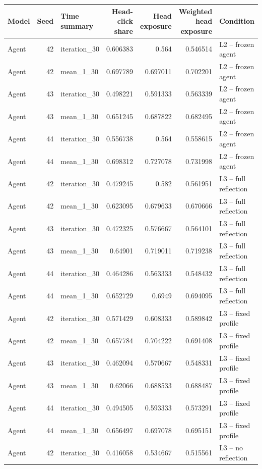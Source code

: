 \begin{table}[htbp!]
\centering
\small
\setlength{\tabcolsep}{3pt}
\renewcommand{\arraystretch}{1.1}
\begin{tabular}{lrlrrrl}
\hline
Model & Seed & Time summary & Head-click share & Head exposure & Weighted head exposure & Condition \\
\hline
Agent & 42 & iteration\_30 & 0.606383 & 0.564 & 0.546514 & L2 -- frozen agent \\
Agent & 42 & mean\_1\_30 & 0.697789 & 0.697011 & 0.702201 & L2 -- frozen agent \\
Agent & 43 & iteration\_30 & 0.498221 & 0.591333 & 0.563339 & L2 -- frozen agent \\
Agent & 43 & mean\_1\_30 & 0.651245 & 0.687822 & 0.682495 & L2 -- frozen agent \\
Agent & 44 & iteration\_30 & 0.556738 & 0.564 & 0.558615 & L2 -- frozen agent \\
Agent & 44 & mean\_1\_30 & 0.698312 & 0.727078 & 0.731998 & L2 -- frozen agent \\
Agent & 42 & iteration\_30 & 0.479245 & 0.582 & 0.561951 & L3 -- full reflection \\
Agent & 42 & mean\_1\_30 & 0.623095 & 0.679633 & 0.670666 & L3 -- full reflection \\
Agent & 43 & iteration\_30 & 0.472325 & 0.576667 & 0.564101 & L3 -- full reflection \\
Agent & 43 & mean\_1\_30 & 0.64901 & 0.719011 & 0.719238 & L3 -- full reflection \\
Agent & 44 & iteration\_30 & 0.464286 & 0.563333 & 0.548432 & L3 -- full reflection \\
Agent & 44 & mean\_1\_30 & 0.652729 & 0.6949 & 0.694095 & L3 -- full reflection \\
Agent & 42 & iteration\_30 & 0.571429 & 0.608333 & 0.589842 & L3 -- fixed profile \\
Agent & 42 & mean\_1\_30 & 0.657784 & 0.704222 & 0.691408 & L3 -- fixed profile \\
Agent & 43 & iteration\_30 & 0.462094 & 0.570667 & 0.548331 & L3 -- fixed profile \\
Agent & 43 & mean\_1\_30 & 0.62066 & 0.688533 & 0.688487 & L3 -- fixed profile \\
Agent & 44 & iteration\_30 & 0.494505 & 0.593333 & 0.573291 & L3 -- fixed profile \\
Agent & 44 & mean\_1\_30 & 0.656497 & 0.697078 & 0.695151 & L3 -- fixed profile \\
Agent & 42 & iteration\_30 & 0.416058 & 0.534667 & 0.515561 & L3 -- no reflection \\

\end{tabular}
\end{table}
